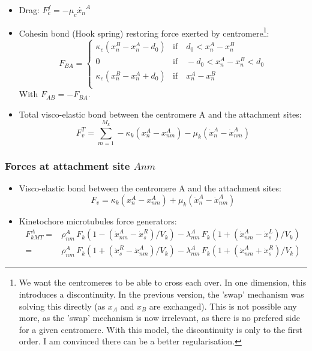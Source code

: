 \documentclass[a4paper,12pt]{article}
\begin{document}
\begin{itemize}
\item Drag: $F_c^f = -\mu_c \dot{x_n}^A$
\item Cohesin bond (Hook spring) restoring force exerted by
  centromere\footnote{We want the centromeres to be able to cross each
    over. In one dimension, this introduces a discontinuity. In the
    previous version, the 'swap' mechanism was solving this directly
    (as $x_A$ and $x_B$ are exchanged). This is not possible any more,
    as the 'swap' mechanism is now irrelevant, as there is no prefered
    side for a given centromere. With this model, the discontinuity is
    only to the first order. I am convinced there can be a better
    regularisation.}:
  \begin{equation}
    F_{BA} =
    \begin{cases}
      \kappa_c (x_n^B - x_n^A - d_0) &\mathrm{if}\quad d_0 < x_n^A - x_n^B\\
      0  &\mathrm{if}\quad - d_0 < x_n^A - x_n^B < d_0\\
      \kappa_c (x_n^B - x_n^A + d_0) &\mathrm{if}\quad  x_n^A - x_n^B\\
    \end{cases}
  \end{equation}
  With $F_{AB} = - F_{BA}$. 
\item Total visco-elastic bond between the centromere A and the attachment
  sites:
  $$ F_v^T = \sum_{m = 1}^{M_k} -\kappa_k(x_n^A - x_{nm}^A) 
  - \mu_k(\dot{x}_n^A - \dot{x}_{nm}^A) $$
\end{itemize}


\subsubsection{Forces at attachment site $Anm$}

\begin{itemize}
\item Visco-elastic bond between the centromere A and the
  attachment sites:
  $$F_v =  \kappa_k(x_n^A - x_{nm}^A) 
  + \mu_k(\dot{x}_n^A - \dot{x}_{nm}^A) $$
\item Kinetochore microtubules force generators:
  \begin{equation}
  \begin{aligned}
    F_{kMT}^A =& \rho_{nm}^A\,F_k\left(1 - (\dot{x}^A_{nm} -
      \dot{x}^R_s)/V_k\right)%
      -\lambda_{nm}^A\,F_k\left(1 +
        (\dot{x}^A_{nm} - \dot{x}^L_s)/V_k\right)\\
    =& \rho_{nm}^A\,F_k\left(1 +  (\dot{x}^R_s - \dot{x}^A_{nm})/V_k\right)%
    - \lambda_{nm}^A\,F_k\left(1 + (\dot{x}^A_{nm} + \dot{x}^R_s)/V_k\right)
  \end{aligned}
\end{equation}
\end{itemize}
\end{document}
